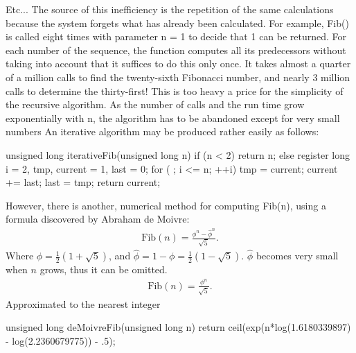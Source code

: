 \documentclass{report}
\begin{document}
Etc... The source of
this inefficiency is the repetition of the same calculations because the system forgets
what has already been calculated. For example, Fib() is called eight times with parameter n = 1 to decide that 1 can be returned. For each number of the sequence, the
function computes all its predecessors without taking into account that it suffices to do
this only once.
\bigbreak \noindent 
It takes almost a quarter of a million calls to find the twenty-sixth Fibonacci
number, and nearly 3 million calls to determine the thirty-first! This is too heavy a
price for the simplicity of the recursive algorithm. As the number of calls and the run
time grow exponentially with n, the algorithm has to be abandoned except for very
small numbers
\bigbreak \noindent 
An iterative algorithm may be produced rather easily as follows:
\bigbreak \noindent 
\begin{cppcode}
    unsigned long iterativeFib(unsigned long n) {
        if (n < 2)
        return n;
        else {
            register long i = 2, tmp, current = 1, last = 0;
            for ( ; i <= n; ++i) {
                tmp = current;
                current += last;
                last = tmp;
            }
            return current;
        }
    }
\end{cppcode}
\bigbreak \noindent 
However, there is another, numerical method for computing Fib(n), using a formula discovered by Abraham de Moivre:
\begin{align*}
    \text{Fib}(n) =  \frac{\phi^{n} - \hat{\phi}^{n}}{\sqrt{5}}
.\end{align*}
Where $\phi = \frac{1}{2}(1+\sqrt{5})$, and $\hat{\phi} = 1-\phi = \frac{1}{2}(1-\sqrt{5}) $. $\hat{\phi}$ becomes very small when $n$ grows, thus it can be omitted. 
\begin{align*}
    \text{Fib}(n) =\frac{\phi^{n}}{\sqrt{5}}
.\end{align*}
Approximated to the nearest integer
\bigbreak \noindent 
\begin{cppcode}
    unsigned long deMoivreFib(unsigned long n) {
        return ceil(exp(n*log(1.6180339897) - log(2.2360679775)) - .5);
    }
\end{cppcode}
\pagebreak 
\end{document}

